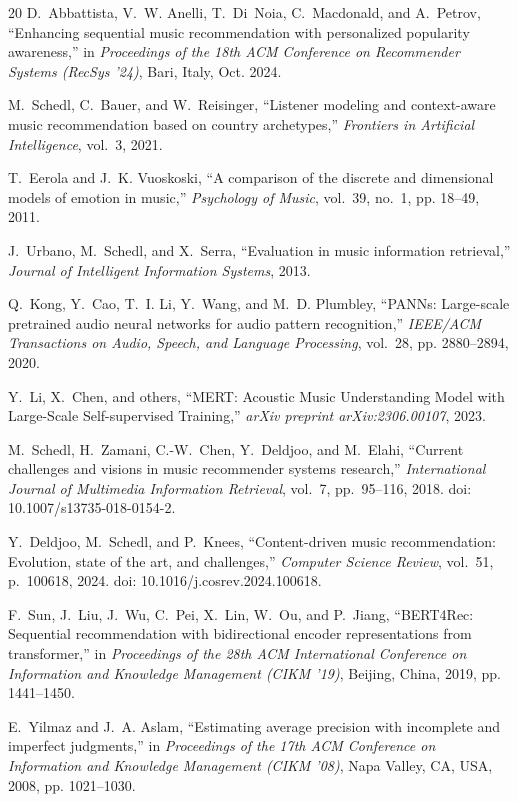 \begin{thebibliography}{20}
D.~Abbattista, V.~W. Anelli, T.~Di~Noia, C.~Macdonald, and A.~Petrov, ``Enhancing sequential music recommendation with personalized popularity awareness,'' in \emph{Proceedings of the 18th ACM Conference on Recommender Systems (RecSys '24)}, Bari, Italy, Oct. 2024.

M.~Schedl, C.~Bauer, and W.~Reisinger, ``Listener modeling and context-aware music recommendation based on country archetypes,'' \emph{Frontiers in Artificial Intelligence}, vol.~3, 2021.

T.~Eerola and J.~K. Vuoskoski, ``A comparison of the discrete and dimensional models of emotion in music,'' \emph{Psychology of Music}, vol.~39, no.~1, pp. 18--49, 2011.

J.~Urbano, M.~Schedl, and X.~Serra, ``Evaluation in music information retrieval,'' \emph{Journal of Intelligent Information Systems}, 2013.

Q.~Kong, Y.~Cao, T.~I. Li, Y.~Wang, and M.~D. Plumbley,
``PANNs: Large-scale pretrained audio neural networks for audio pattern recognition,''
\emph{IEEE/ACM Transactions on Audio, Speech, and Language Processing},
vol.~28, pp. 2880--2894, 2020.

Y.~Li, X.~Chen, and others, ``MERT: Acoustic Music Understanding Model with Large-Scale Self-supervised Training,'' \emph{arXiv preprint arXiv:2306.00107}, 2023.

M.~Schedl, H.~Zamani, C.-W.~Chen, Y.~Deldjoo, and M.~Elahi,
``Current challenges and visions in music recommender systems research,''
\emph{International Journal of Multimedia Information Retrieval},
vol.~7, pp.~95--116, 2018.
doi: 10.1007/s13735-018-0154-2.

Y.~Deldjoo, M.~Schedl, and P.~Knees,
``Content-driven music recommendation: Evolution, state of the art, and challenges,''
\emph{Computer Science Review},
vol.~51, p.~100618, 2024.
doi: 10.1016/j.cosrev.2024.100618.

F.~Sun, J.~Liu, J.~Wu, C.~Pei, X.~Lin, W.~Ou, and P.~Jiang,
``BERT4Rec: Sequential recommendation with bidirectional encoder representations from transformer,''
in \emph{Proceedings of the 28th ACM International Conference on Information and Knowledge Management (CIKM '19)},
Beijing, China, 2019, pp. 1441--1450.

E.~Yilmaz and J.~A. Aslam,
``Estimating average precision with incomplete and imperfect judgments,''
in \emph{Proceedings of the 17th ACM Conference on Information and Knowledge Management (CIKM '08)},
Napa Valley, CA, USA, 2008, pp. 1021--1030.

\end{thebibliography}
